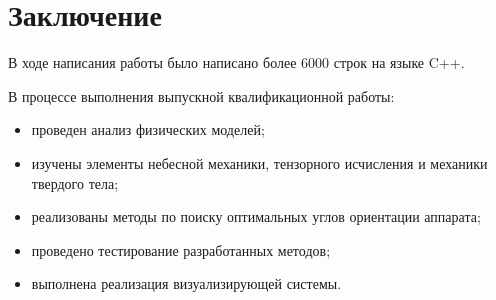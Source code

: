 \chapter{Заключение}
\noindent\indent В ходе написания работы было написано более 6000 строк на языке
C++.\par
    В процессе выполнения выпускной квалификационной работы:
\begin{itemize}
    \item проведен анализ физических моделей;
    \item изучены элементы небесной механики, тензорного исчисления и механики
    твердого тела;
    \item реализованы методы по поиску оптимальных углов ориентации аппарата;
    \item проведено тестирование разработанных методов;
    \item выполнена реализация визуализирующей системы.
\end{itemize}

